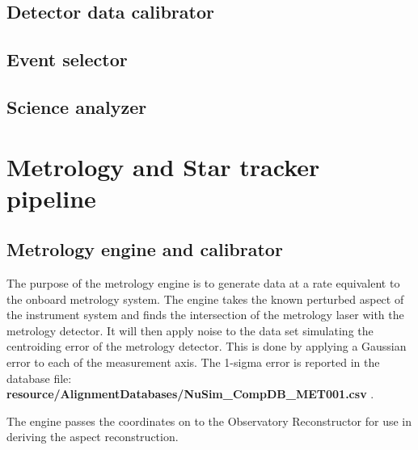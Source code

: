 \subsection{Detector data calibrator}

\subsection{Event selector}

\subsection{Science analyzer}

\section{Metrology and Star tracker pipeline}
\subsection{Metrology engine and calibrator}
The purpose of the metrology engine is to generate data at a rate equivalent to the onboard metrology system. The engine takes the known perturbed aspect of the instrument system and finds the intersection of the metrology laser with the metrology detector. It will then apply noise to the data set simulating the centroiding error of the metrology detector. This is done by applying a Gaussian error to each of the measurement axis. The 1-sigma error is reported in the database file:\\ \textbf{resource/AlignmentDatabases/NuSim\_CompDB\_MET001.csv} . 

The engine passes the coordinates on to the Observatory Reconstructor for use in deriving the aspect reconstruction.

